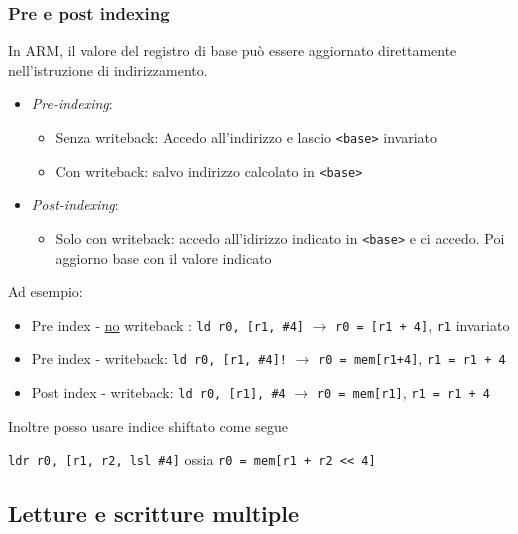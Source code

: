 \subsubsection*{Pre e post indexing}
In ARM, il valore del registro di base può essere aggiornato direttamente nell'istruzione di indirizzamento.
\begin{itemize}
	\item \textit{Pre-indexing}:
	      \begin{itemize}
		      \item Senza writeback: Accedo all'indirizzo e lascio \verb|<base>| invariato
		      \item  Con writeback: salvo indirizzo calcolato in \verb|<base>|
	      \end{itemize}
	\item \textit{Post-indexing}:
	      \begin{itemize}
		      \item Solo con writeback: accedo all'idirizzo indicato in \verb|<base>| e ci accedo. Poi aggiorno base con il valore indicato
	      \end{itemize}
\end{itemize}
Ad esempio:
\begin{itemize}
  \item Pre index - \underline{no} writeback : \verb|ld r0, [r1, #4]| $ \rightarrow  $ \verb|r0 = [r1 + 4]|, \verb|r1| invariato
	\item Pre index - writeback: \verb|ld r0, [r1, #4]!| $ \rightarrow  $ \verb|r0 = mem[r1+4]|, \verb|r1 = r1 + 4|
  \item Post index - writeback: \verb|ld r0, [r1], #4| $ \rightarrow  $ \verb|r0 = mem[r1]|, \verb|r1 = r1 + 4|
\end{itemize}
Inoltre posso usare indice shiftato come segue 
\begin{center}
  \verb|ldr r0, [r1, r2, lsl #4]| ossia \verb|r0 = mem[r1 + r2 << 4]|
\end{center}
\subsection{Letture e scritture multiple}

